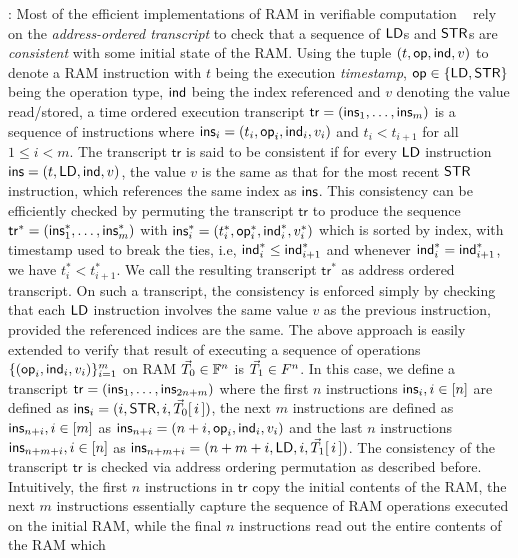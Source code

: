 \documentclass[11pt]{article}
\begin{document}
    : Most of the efficient implementations of RAM in verifiable computation ~\cite{C:BCGTV13, NDSS:WSRBW15, SP:ZGKPP18}
    rely on the {\em address-ordered transcript} to check that a sequence of $\mathsf{LD}$s and $\mathsf{STR}$s are {\em consistent} with some initial state
    of the RAM. Using the tuple $(t,\mathsf{op},\mathsf{ind}, v)$ to denote a RAM instruction with $t$ being the execution {\em timestamp}, $\mathsf{op}\in \{\mathsf{LD},\mathsf{STR}\}$ being
    the operation type, $\mathsf{ind}$ being the index referenced and $v$ denoting the value read/stored, a time ordered execution transcript $\mathsf{tr} = (\mathsf{ins}_1,\ldots,\mathsf{ins}_m)$ is a sequence
    of instructions where $\mathsf{ins}_i=(t_i,\mathsf{op}_i,\mathsf{ind}_i, v_i)$ and $t_i < t_{i+1}$ for all $1\leq i<m$. The transcript $\mathsf{tr}$ is said to be consistent if
    for every $\mathsf{LD}$ instruction $\mathsf{ins}=(t,\mathsf{LD},\mathsf{ind},v)$, the value $v$ is the same as that for the most recent $\mathsf{STR}$ instruction, which references the same index
    as $\mathsf{ins}$. This consistency can be efficiently checked by permuting the transcript $\mathsf{tr}$ to produce the sequence
    $\mathsf{tr}^\ast=(\mathsf{ins}_1^\ast,\ldots,\mathsf{ins}_m^\ast)$ with $\mathsf{ins}_i^\ast=(t_i^\ast,\mathsf{op}_i^\ast,\mathsf{ind}_i^\ast,v_i^\ast)$ which is sorted by index, with
    timestamp used to break the ties, i.e, $\mathsf{ind}_i^\ast\leq \mathsf{ind}_{i+1}^\ast$ and whenever $\mathsf{ind}_i^\ast=\mathsf{ind}_{i+1}^\ast$, we have $t_i^\ast < t_{i+1}^\ast$.
    We call the resulting transcript $\mathsf{tr}^\ast$ as address ordered transcript. On such a transcript, the consistency is enforced simply by
    checking that each $\mathsf{LD}$ instruction involves the same value $v$ as the previous instruction, provided the referenced indices are the same.
    The above approach is easily extended to verify that result of executing a sequence of operations $\{(\mathsf{op}_i,\mathsf{ind}_i,v_i)\}_{i=1}^m$ on
    RAM $\vec{T}_0\in \mathbb{F}^n$ is $\vec{T}_1\in F^n$. In this case, we define a transcript $\mathsf{tr}=(\mathsf{ins}_1,\ldots,\mathsf{ins}_{2n+m})$ where the
    first $n$ instructions $\mathsf{ins}_i,i\in [n]$ are defined as $\mathsf{ins}_i=(i,\mathsf{STR},i,\vec{T}_0[\,i\,])$, the next $m$ instructions are defined
    as $\mathsf{ins}_{n+i},i\in [m]$ as $\mathsf{ins}_{n+i}=(n+i, \mathsf{op}_i, \mathsf{ind}_i, v_i)$ and the last $n$ instructions $\mathsf{ins}_{n+m+i}, i\in [n]$ as
    $\mathsf{ins}_{n+m+i}=(n+m+i,\mathsf{LD},i,\vec{T}_1[\,i\,])$. The consistency of the transcript $\mathsf{tr}$ is checked via address ordering permutation as
    described before. Intuitively, the first $n$ instructions in $\mathsf{tr}$ copy the initial contents of the RAM, the next $m$ instructions essentially
    capture the sequence of RAM operations executed on the initial RAM, while the final $n$ instructions read out the entire contents of the RAM which
\end{document}
